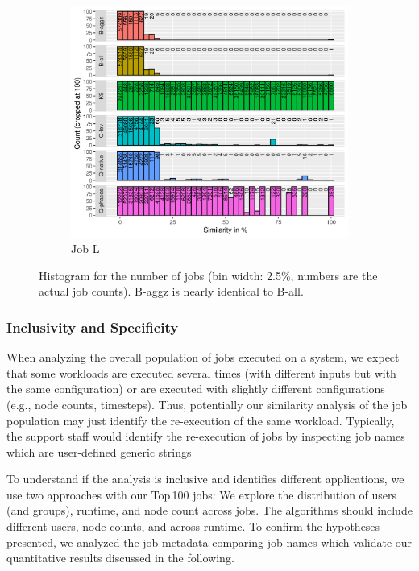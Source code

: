 \documentclass{jhps}
\begin{document}
\begin{figure}
\begin{subfigure}{0.7\textwidth}
\centering
\includegraphics[width=\textwidth,trim={0 0 0 2.0cm},clip]{job_similarities_7488914-out/hist-sim}
\caption{Job-L}\label{fig:hist-job-L}
\end{subfigure}
\centering
\caption{Histogram for the number of jobs (bin width: 2.5\%, numbers are the actual job counts). B-aggz is nearly identical to B-all.}%
\label{fig:hist}
\end{figure}

\subsubsection{Inclusivity and Specificity}

When analyzing the overall population of jobs executed on a system, we expect that some workloads are executed several times (with different inputs but with the same configuration) or are executed with slightly different configurations (e.g., node counts, timesteps).
Thus, potentially our similarity analysis of the job population may just identify the re-execution of the same workload.
Typically, the support staff would identify the re-execution of jobs by inspecting job names which are user-defined generic strings%

To understand if the analysis is inclusive and identifies different applications, we use two approaches with our Top\,100 jobs:
We explore the distribution of users (and groups), runtime, and node count across jobs.
The algorithms should include different users, node counts, and across runtime.
To confirm the hypotheses presented, we analyzed the job metadata comparing job names which validate our quantitative results discussed in the following.
\end{document}
